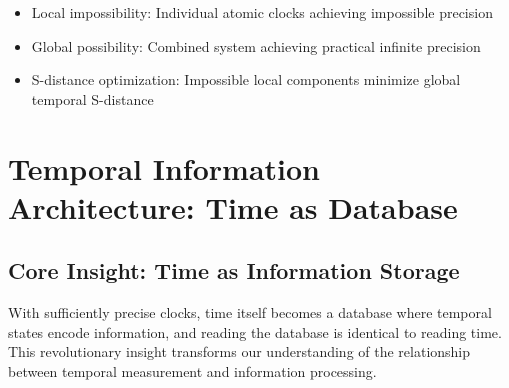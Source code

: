 \documentclass[12pt,a4paper]{article}
\begin{document}
{\begin{itemize}
\item Local impossibility: Individual atomic clocks achieving impossible precision
\item Global possibility: Combined system achieving practical infinite precision
\item S-distance optimization: Impossible local components minimize global temporal S-distance
\end{itemize}

\section{Temporal Information Architecture: Time as Database}

\subsection{Core Insight: Time as Information Storage}

With sufficiently precise clocks, time itself becomes a database where temporal states encode information, and reading the database is identical to reading time. This revolutionary insight transforms our understanding of the relationship between temporal measurement and information processing.

\begin{figure}[H]
\centering
{}
\end{figure}}
\end{document}
